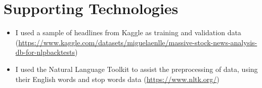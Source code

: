 \documentclass[ oneside,%
                    author={Joshua Felmeden},
                    degree={MEng},
                     title={Semantic Analysis of Financial Headlines Based on Realised Stock Returns},
                  subtitle={}]{dissertation}
\begin{document}

\chapter*{Supporting Technologies}




\begin{itemize}
      \item I used a sample of headlines from Kaggle as training and validation data (\url{https://www.kaggle.com/datasets/miguelaenlle/massive-stock-news-analysis-db-for-nlpbacktests})
      \item I used the Natural Language Toolkit to assist the preprocessing of data, using their English words and stop words data (\url{https://www.nltk.org/})
\end{itemize}
\end{document}
